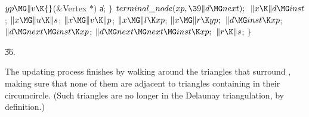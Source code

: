 ${}\\{yp}\MG\|v\K{}$(\&{Vertex} ${}{*}){}$ \|a;\6
\4${}\}{}$\2\6
${}\\{terminal\_node}(\\{xp},\39\|d\MG\\{next});{}$\6
${}\|x\K\|d\MG\\{inst}{}$;\5
${}\|x\MG\|u\K\|s{}$;\5
${}\|x\MG\|v\K\|p{}$;\5
${}\|x\MG\|l\K\\{xp}{}$;\5
${}\|x\MG\|r\K\\{yp};{}$\6
${}\|d\MG\\{inst}\K\\{xp}{}$;\5
${}\|d\MG\\{next}\MG\\{inst}\K\\{xp}{}$;\5
${}\|d\MG\\{next}\MG\\{next}\MG\\{inst}\K\\{xp};{}$\6
${}\|r\K\|s{}$;\6
\4${}\}{}$\2\par
\U36.\fi

The updating process finishes by walking around the triangles
that surround , making sure that none of them are adjacent to
triangles containing  in their circumcircle. (Such triangles are
no longer in the Delaunay triangulation, by definition.)

